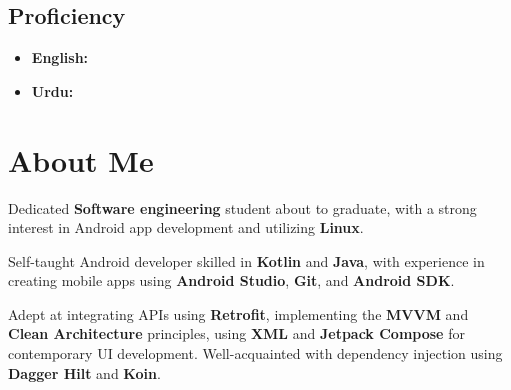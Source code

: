 \documentclass[bold]{deedy-resume-openfont}
\begin{document}
\begin{minipage}[t]{0.33\textwidth}
\subsection{Proficiency}
\begin{itemize}[label=\textbullet, leftmargin=*, topsep=5pt, itemsep=-1ex]
    \item \textbf{English:} 
    \item \textbf{Urdu:} 
\end{itemize}
\sectionsep



%
%

\end{minipage} 
\hfill
\begin{minipage}[t]{0.66\textwidth} 


\section{About Me}
\descript{}
\vspace{10pt} %
\begin{tightemize}
\item Dedicated \textbf{Software engineering} student about to graduate, with a strong interest in Android app development and utilizing \textbf{Linux}.
\item Self-taught Android developer skilled in \textbf{Kotlin} and \textbf{Java}, with experience in creating mobile apps using \textbf{Android Studio}, \textbf{Git}, and \textbf{Android SDK}.
\item Adept at integrating APIs using \textbf{Retrofit}, implementing the \textbf{MVVM} and \textbf{Clean Architecture} principles, using \textbf{XML} and \textbf{Jetpack Compose} for contemporary UI development. Well-acquainted with dependency injection using \textbf{Dagger Hilt} and \textbf{Koin}.
\end{tightemize}
\sectionsep



\end{minipage}
\end{document}
